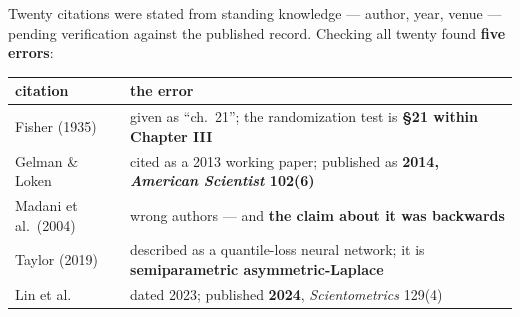 Twenty citations were stated from standing knowledge --- author, year, venue --- pending
verification against the published record. Checking all twenty found \textbf{five errors}:

\begin{longtable}[]{@{}ll@{}}
\toprule
\begin{minipage}[b]{0.47\columnwidth}\raggedright
citation\strut
\end{minipage} & \begin{minipage}[b]{0.47\columnwidth}\raggedright
the error\strut
\end{minipage}\tabularnewline
\midrule
\endhead
\begin{minipage}[t]{0.47\columnwidth}\raggedright
Fisher (1935)\strut
\end{minipage} & \begin{minipage}[t]{0.47\columnwidth}\raggedright
given as ``ch.~21''; the randomization test is \textbf{\S21 within Chapter III}\strut
\end{minipage}\tabularnewline
\begin{minipage}[t]{0.47\columnwidth}\raggedright
Gelman \& Loken\strut
\end{minipage} & \begin{minipage}[t]{0.47\columnwidth}\raggedright
cited as a 2013 working paper; published as \textbf{2014, \emph{American Scientist} 102(6)}\strut
\end{minipage}\tabularnewline
\begin{minipage}[t]{0.47\columnwidth}\raggedright
Madani et al.~(2004)\strut
\end{minipage} & \begin{minipage}[t]{0.47\columnwidth}\raggedright
wrong authors --- and \textbf{the claim about it was backwards}\strut
\end{minipage}\tabularnewline
\begin{minipage}[t]{0.47\columnwidth}\raggedright
Taylor (2019)\strut
\end{minipage} & \begin{minipage}[t]{0.47\columnwidth}\raggedright
described as a quantile-loss neural network; it is \textbf{semiparametric asymmetric-Laplace}\strut
\end{minipage}\tabularnewline
\begin{minipage}[t]{0.47\columnwidth}\raggedright
Lin et al.\strut
\end{minipage} & \begin{minipage}[t]{0.47\columnwidth}\raggedright
dated 2023; published \textbf{2024}, \emph{Scientometrics} 129(4)\strut
\end{minipage}\tabularnewline
\bottomrule
\end{longtable}

